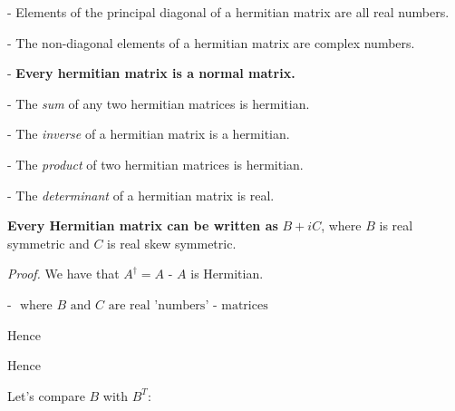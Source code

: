 \documentclass{article}
\begin{document}
- Elements of the principal diagonal of a hermitian matrix are all real numbers.

- The non-diagonal elements of a hermitian matrix are complex numbers.

- \textbf{Every hermitian matrix is a normal matrix.}

- The \textit{sum} of any two hermitian matrices is hermitian.

- The \textit{inverse} of a hermitian matrix is a hermitian.

- The \textit{product} of two hermitian matrices is hermitian.

- The \textit{determinant} of a hermitian matrix is real.



\textbf{Every Hermitian matrix can be written as } $B + iC$, where $B$ is real symmetric and $C$ is real skew symmetric.

\textit{Proof.} We have that $A^\dag = A$ - $A$ is Hermitian.


- $ \text{ where } B \text{ and } C \text{ are real 'numbers' - matrices} $

Hence


Hence


Let's compare $B$ with $B^T$:

\end{document}
